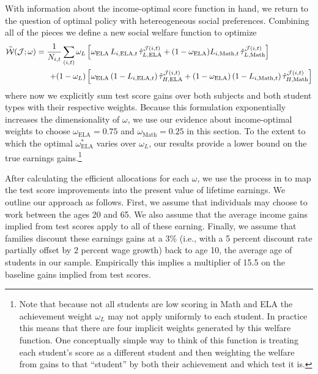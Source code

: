 \documentclass[12pt]{article}
\theoremstyle{definition}
\theoremstyle{definition}
\theoremstyle{definition}
\theoremstyle{definition}
\begin{document}
With information about the income-optimal score function in hand, we return to the question of 
optimal policy with hetereogeneous social preferences. Combining all of the pieces we define a new social welfare function to optimize
\begin{align*}
\accentset{\sim}{\mathcal{W}}(\mathcal{J};\omega) =  \frac{1}{N_{i,t}}\sum_{(i,t)} \omega_L &\left [\omega_{\text{ELA}} \, L_{i,\text{ELA},t} \,\hat{\tau}^{\mathcal{J}(i,t)}_{L,\text{ELA}}  + (1-\omega_{\text{ELA}}) L_{i,\text{Math},t} \,\hat{\tau}^{\mathcal{J}(i,t)}_{L,\text{Math}} \right ] \\
+(1-\omega_L) & \left [\omega_{\text{ELA}} \, (1-L_{i,\text{ELA},t}) \,\hat{\tau}^{\mathcal{J}(i,t)}_{H,\text{ELA}}  + (1-\omega_{\text{ELA}}) \, (1-L_{i,\text{Math},t}) \,\hat{\tau}^{\mathcal{J}(i,t)}_{H,\text{Math}} \right ]
\end{align*}
\noindent where now we explicitly sum test score gains over both subjects and both student types with their respective weights. Because this formulation exponentially increases the dimensionality of $\omega$, we use our evidence about income-optimal weights to choose $\omega_{\text{ELA}}=0.75$  and $\omega_{\text{Math}}=0.25$ in this section. To the extent to which the optimal $\omega^*_{\text{ELA}}$ varies over $\omega_L$, our results provide a lower bound on the true earnings gains.\footnote{Note that because not all students are low scoring in Math and ELA the achievement weight $\omega_L$ may not apply uniformly to each student. In practice this means that there are four implicit weights generated by this welfare function. One conceptually simple way to think of this function is treating each student's score as a different student and then weighting the welfare from gains to that ``student'' by both their achievement and which test it is.}

After calculating the efficient allocations for each $\omega$, we use the process in \citet{chetty2014measuring1} to map the test score improvements into the present value of lifetime earnings. We outline our approach as follows. First, we assume that individuals may choose to work between the ages 20 and 65. We also assume that the average income gains implied from test scores apply to all of these earning. Finally, we assume that families discount these earnings gains at a 3\% (i.e., with a 5 percent discount rate partially offset by 2 percent wage growth) back to age 10, the average age of students in our sample. Empirically this implies a multiplier of 15.5 on the baseline gains implied from test scores.
\end{document}
